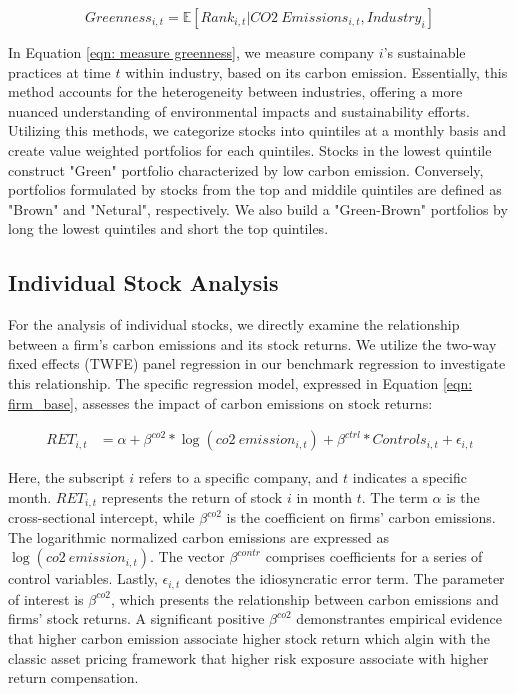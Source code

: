 \documentclass[12pt]{article}
\begin{document}
\begin{equation}
\label{eqn: measure greenness}
Greenness_{i, t} = \mathbb{E}[Rank_{i,t} | CO2 \: Emissions_{i, t}, Industry_i]
\end{equation}

In Equation \ref{eqn: measure greenness}, we measure company $i$'s sustainable practices at time $t$ within industry, based on its carbon emission. Essentially, this method accounts for the heterogeneity between industries, offering a more nuanced understanding of environmental impacts and sustainability efforts. Utilizing this methods, we categorize stocks into quintiles at a monthly basis and create value weighted portfolios for each quintiles. Stocks in the lowest quintile construct "Green" portfolio characterized by low carbon emission. Conversely, portfolios formulated by stocks from the top and middile quintiles are defined as "Brown" and "Netural", respectively. We also build a "Green-Brown" portfolios by long the lowest quintiles and short the top quintiles.

\subsection{Individual Stock Analysis}

For the analysis of individual stocks, we directly examine the relationship between a firm's carbon emissions and its stock returns. We utilize the two-way fixed effects (TWFE) panel regression in our benchmark regression to investigate this relationship. The specific regression model, expressed in Equation \ref{eqn: firm_base}, assesses the impact of carbon emissions on stock returns:

\begin{align}
    \label{eqn: firm_base}
    RET_{i, t} &= \alpha + \beta^{co2}*\log(co2 \: emission_{i, t}) + \beta^{ctrl}*Controls_{i, t} + \epsilon_{i, t}
\end{align}
    
Here, the subscript $i$ refers to a specific company, and $t$ indicates a specific month. $RET_{i, t}$ represents the return of stock $i$ in month $t$. The term $\alpha$ is the cross-sectional intercept, while $\beta^{co2}$ is the coefficient on firms' carbon emissions. The logarithmic normalized carbon emissions are expressed as $\log(co2 \: emission_{i, t})$. The vector $\beta^{contr}$ comprises coefficients for a series of control variables. Lastly, $\epsilon_{i, t}$ denotes the idiosyncratic error term. The parameter of interest is $\beta^{co2}$, which presents the relationship between carbon emissions and firms' stock returns. A significant positive $\beta^{co2}$ demonstrantes empirical evidence that higher carbon emission associate higher stock return which algin with the classic asset pricing framework that higher risk exposure associate with higher return compensation.
\end{document}
